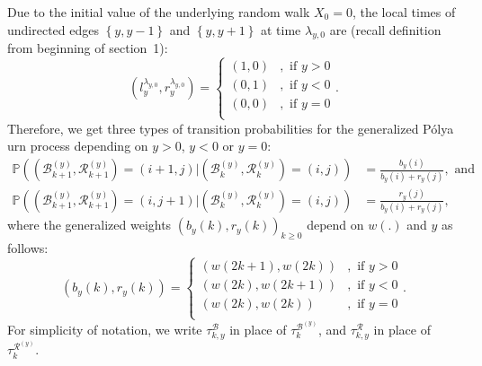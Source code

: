 \documentclass[EJP]{ejpecp} %
\begin{document}
Due to the initial value of the underlying random walk $X_0=0$, the local times of undirected edges $\left\{y,y-1\right\}$ and $\left\{y,y+1\right\}$ at time $\lambda_{y,0}$ are (recall definition from beginning of section~1):
\begin{equation}\label{eq: initial condition}
	\left(l_y^{\lambda_{y,0}},  r_y^{\lambda_{y,0}}\right) =  \begin{cases}	
		(1, 0) &,  \text{ if }  y>0 \\
		(0, 1) &,  \text{ if }  y<0 \\  
		(0, 0) &,  \text{ if }  y=0 \\
	\end{cases} 
	.\end{equation}	
Therefore, we get three types of transition probabilities
for the generalized P\'{o}lya urn process depending on $y>0$, $y<0$ or $y=0$:
\begin{align*}\label{eq: transition prob for GPU}
	\mathbb{P} \left(\left(\mathscr{B}^{(y)}_{k+1},\mathscr{R}^{(y)}_{k+1} \right)=  (i+1,j) \vert \left(\mathscr{B}^{(y)}_{k},\mathscr{R}^{(y)}_{k}\right) =(i,j)  \right) &= \frac{b_y(i)}{b_y(i)+r_y(j)}, \mbox{ and}  \\
	\mathbb{P} \left( \left(\mathscr{B}^{(y)}_{k+1},\mathscr{R}^{(y)}_{k+1}\right)=  (i,j+1) \vert \left(\mathscr{B}^{(y)}_{k},\mathscr{R}^{(y)}_{k}\right) =(i,j)  \right) &= \frac{r_y(j)}{b_y(i)+r_y(j)},
\end{align*} 
where the generalized weights $(b_y(k),r_y(k))_{k\geq 0}$ depend on $w(.)$ and $y$ as follows:
\begin{equation}\label{eq: generalized weights}
	(b_y(k), r_y(k)) = \begin{cases}
		(w(2k+1), w(2k)) &,  \text{ if }  y>0 \\
		(w(2k), w(2k+1)) &,  \text{ if }  y<0 \\  
		(w(2k), w(2k)) &,  \text{ if }  y=0 \\ 
	\end{cases}.
\end{equation}
For simplicity of notation, we write $\tau_{k,y}^{\mathscr{B}}$ in place of $\tau_k^{\mathscr{B}^{(y)}}$, and $\tau_{k,y}^{\mathscr{R}}$ in place of $\tau_k^{\mathscr{R}^{(y)}}$.
\end{document}
